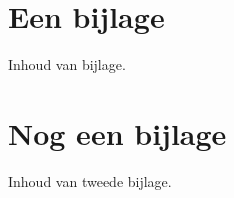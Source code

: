 \begin{appendices}


\chapter{Een bijlage}

Inhoud van bijlage.


\chapter{Nog een bijlage}

Inhoud van tweede bijlage.


\end{appendices}
